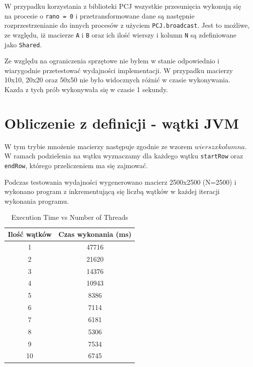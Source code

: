\documentclass[11pt]{article}
\begin{document}
    W przypadku korzystania z biblioteki PCJ wszystkie przesunięcia wykonują się na procesie o \verb|rano = 0| i przetransformowane
    dane są następnie rozprzestrzenianie do innych procesów z użyciem \verb|PCJ.broadcast|. Jest to możliwe, ze względu, iż
    macierze \verb|A| i \verb|B| oraz ich ilość wierszy i kolumn \verb|N| są zdefiniowane jako \verb|Shared|.

    Ze względu na ograniczenia sprzętowe nie byłem w stanie odpowiednio i wiarygodnie przetestować wydajności implementacji.
    W przypadku macierzy 10x10, 20x20 oraz 50x50 nie było widocznych różnić w czasie wykonywania. Kazda z tych prób wykonywała
    się w czasie 1 sekundy.

    \section{Obliczenie z definicji - wątki JVM}

    W tym trybie mnożenie macierzy następuje zgodnie ze wzorem $wiersz x kolumna$. W ramach podzielenia na wątku wyznaczamy
    dla każdego wątku \verb|startRow| oraz \verb|endRow|, którego przeliczeniem ma się zajmować.

    Podczas testowania wydajności wygenerowano macierz 2500x2500 (N=2500) i wykonano program z inkrementującą się liczbą
    wątków w każdej iteracji wykonania programu.

    \begin{table}[h]
        \centering
        \begin{tabular}{|c|c|}
            \hline
            \textbf{Ilość wątków} & \textbf{Czas wykonania (ms)} \\
            \hline
            1  & 47716 \\
            2  & 21620 \\
            3  & 14376 \\
            4  & 10943 \\
            5  & 8386  \\
            6  & 7114  \\
            7  & 6181  \\
            8  & 5306  \\
            9  & 7534  \\
            10 & 6745  \\
            \hline
        \end{tabular}
        \caption{Execution Time vs Number of Threads}
        \label{tab:execution_time}
    \end{table}
\end{document}
